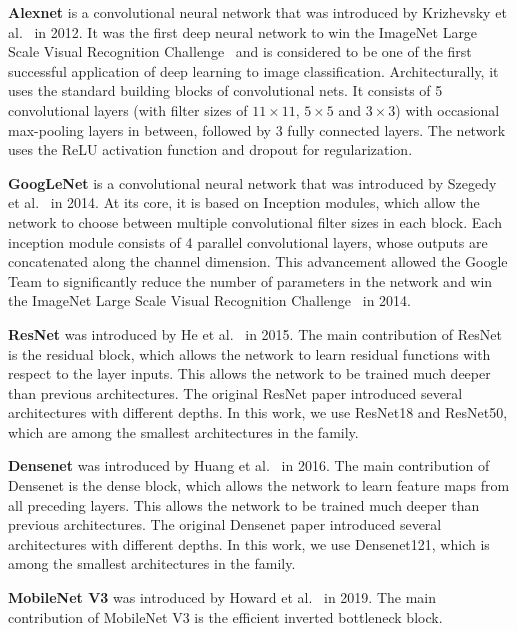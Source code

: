 \documentclass[a4paper]{article}
\begin{document}
  \textbf{Alexnet} is a convolutional neural network that was introduced by
  Krizhevsky et al.~\cite{alexnet} in 2012. It was the first deep neural network
  to win the ImageNet Large Scale Visual Recognition Challenge~\cite{imagenet}
  and is considered to be one of the first successful application of deep
  learning to image classification. Architecturally, it uses the standard
  building blocks of convolutional nets. It consists of 5 convolutional layers
  (with filter sizes of $11 \times 11$, $5 \times 5$ and $3 \times 3$) with
  occasional max-pooling layers in between, followed by 3 fully connected
  layers. The network uses the ReLU activation function and dropout for
  regularization.

  \textbf{GoogLeNet} is a convolutional neural network that was introduced by
  Szegedy et al.~\cite{googlenet} in 2014. At its core, it is based on Inception
  modules, which allow the network to choose between multiple convolutional
  filter sizes in each block. Each inception module consists of 4 parallel
  convolutional layers, whose outputs are concatenated along the channel
  dimension. This advancement allowed the Google Team to significantly reduce
  the number of parameters in the network and win the ImageNet Large Scale
  Visual Recognition Challenge~\cite{imagenet} in 2014.

  \textbf{ResNet} was introduced by He et al.~\cite{resnet} in 2015. The main
  contribution of ResNet is the residual block, which allows the network to
  learn residual functions with respect to the layer inputs. This allows the
  network to be trained much deeper than previous architectures. The original
  ResNet paper introduced several architectures with different depths. In this
  work, we use ResNet18 and ResNet50, which are among the smallest architectures
  in the family.

  \textbf{Densenet} was introduced by Huang et al.~\cite{densenet} in 2016. The
  main contribution of Densenet is the dense block, which allows the network to
  learn feature maps from all preceding layers. This allows the network to be
  trained much deeper than previous architectures. The original Densenet paper
  introduced several architectures with different depths. In this work, we use
  Densenet121, which is among the smallest architectures in the family.

  \textbf{MobileNet V3} was introduced by Howard et al.~\cite{mobilenetv3} in
  2019. The main contribution of MobileNet V3 is the efficient inverted
  bottleneck block.
\end{document}
